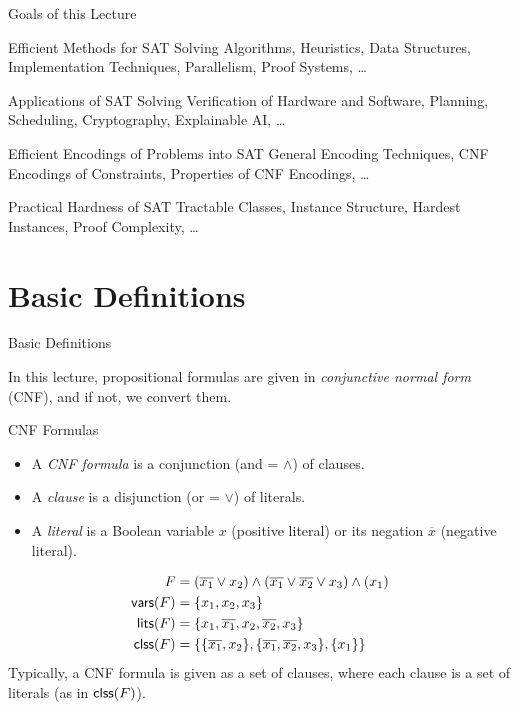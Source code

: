 \documentclass[t]{sdqbeamer}
\begin{document}
\begin{frame}{Goals of this Lecture}
\begin{block}{Efficient Methods for SAT Solving}
	Algorithms, Heuristics, Data Structures, Implementation Techniques, Parallelism, Proof Systems, \dots
\end{block}
\pause
\begin{block}{Applications of SAT Solving}
	Verification of Hardware and Software, Planning, Scheduling, Cryptography, Explainable AI, \dots
\end{block}
\pause
\begin{block}{Efficient Encodings of Problems into SAT}
	General Encoding Techniques, CNF Encodings of Constraints, Properties of CNF Encodings, \dots
\end{block}
\pause
\begin{block}{Practical Hardness of SAT}
	Tractable Classes, Instance Structure, Hardest Instances, Proof Complexity, \dots
\end{block}
\end{frame}


\section{Basic Definitions}

\begin{frame}{Basic Definitions}

In this lecture, propositional formulas are given in \emph{conjunctive normal form} (CNF), and if not, we convert them.

\begin{block}{CNF Formulas}
	\begin{itemize}
		\item A \emph{CNF formula} is a conjunction (and = $\wedge$) of clauses.
		\item A \emph{clause} is a disjunction (or = $\vee$) of literals.
		\item A \emph{literal} is a Boolean variable $x$ (positive literal) or its negation $\overline{x}$ (negative literal).
	\end{itemize}	
\end{block}

\begin{example}
	\vspace{-3ex}
	\begin{align*}
		F &= (\overline{x_1} \vee x_2) \wedge (\overline{x_1} \vee \overline {x_2} \vee x_3) \wedge (x_1)\\
		\textsf{vars}(F) &= \{x_1, x_2, x_3\}\\
		\textsf{lits}(F) &= \{x_1, \overline{x_1}, x_2, \overline{x_2}, x_3\}\\
		\textsf{clss}(F) &= \{ \{ \overline{x_1}, x_2 \}, \{ \overline{x_1}, \overline {x_2}, x_3 \}, \{ x_1 \} \}
	\end{align*}
	Typically, a CNF formula is given as a set of clauses, where each clause is a set of literals (as in $\textsf{clss}(F)$).
\end{example}
\end{frame}
\end{document}
